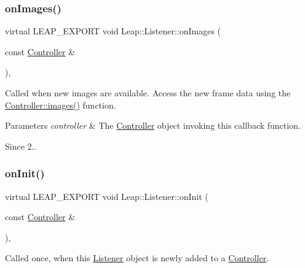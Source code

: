 \subsubsection{\texorpdfstring{on\+Images()}{onImages()}}
{\footnotesize\ttfamily virtual L\+E\+A\+P\+\_\+\+E\+X\+P\+O\+RT void Leap\+::\+Listener\+::on\+Images (\begin{DoxyParamCaption}\item[{const \hyperlink{class_leap_1_1_controller}{Controller} \&}]{ }\end{DoxyParamCaption})\hspace{0.3cm}{\ttfamily [inline]}, {\ttfamily [virtual]}}

Called when new images are available. Access the new frame data using the \hyperlink{class_leap_1_1_controller_ac6fe10acc42b6c830e26fb8fbb88b895}{Controller\+::images()} function.


\begin{DoxyCodeInclude}
\end{DoxyCodeInclude}



\begin{DoxyParams}{Parameters}
{\em controller} & The \hyperlink{class_leap_1_1_controller}{Controller} object invoking this callback function. \\
\hline
\end{DoxyParams}
\begin{DoxySince}{Since}
2.. 
\end{DoxySince}
\mbox{\label{class_leap_1_1_listener_a180d621ad08afa5851d03d3546a82bbf}} 
\subsubsection{\texorpdfstring{on\+Init()}{onInit()}}
{\footnotesize\ttfamily virtual L\+E\+A\+P\+\_\+\+E\+X\+P\+O\+RT void Leap\+::\+Listener\+::on\+Init (\begin{DoxyParamCaption}\item[{const \hyperlink{class_leap_1_1_controller}{Controller} \&}]{ }\end{DoxyParamCaption})\hspace{0.3cm}{\ttfamily [inline]}, {\ttfamily [virtual]}}

Called once, when this \hyperlink{class_leap_1_1_listener}{Listener} object is newly added to a \hyperlink{class_leap_1_1_controller}{Controller}.


